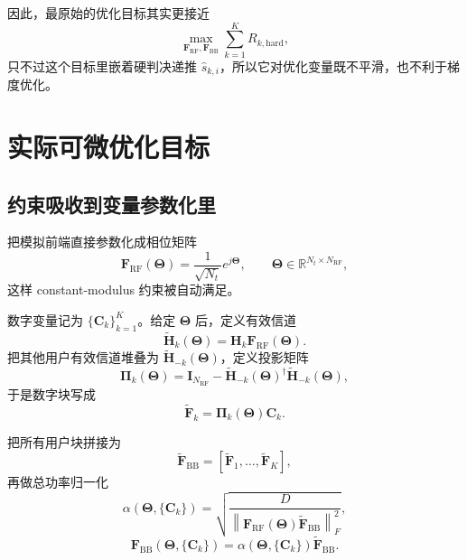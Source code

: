 \documentclass[11pt]{ctexart}
\newcommand{\Id}{\bm{I}}
\begin{document}
因此，最原始的优化目标其实更接近
\begin{equation}
    \max_{\bm F_{\mathrm{RF}},\bm F_{\mathrm{BB}}}
    \sum_{k=1}^{K} R_{k,\mathrm{hard}},
\end{equation}
只不过这个目标里嵌着硬判决递推 $\hat s_{k,i}$，所以它对优化变量既不平滑，也不利于梯度优化。

\section{实际可微优化目标}
\subsection{约束吸收到变量参数化里}
把模拟前端直接参数化成相位矩阵
\begin{equation}
    \bm{F}_{\mathrm{RF}}(\bm{\Theta})
    =
    \frac{1}{\sqrt{N_t}}e^{j\bm{\Theta}},
    \qquad
    \bm{\Theta}\in\mathbb{R}^{N_t\times N_{\mathrm{RF}}},
\end{equation}
这样 constant-modulus 约束被自动满足。

数字变量记为 $\{\bm{C}_k\}_{k=1}^K$。给定 $\bm{\Theta}$ 后，定义有效信道
\begin{equation}
    \widetilde{\bm{H}}_k(\bm{\Theta})
    =
    \bm{H}_k\bm{F}_{\mathrm{RF}}(\bm{\Theta}).
\end{equation}
把其他用户有效信道堆叠为 $\widetilde{\bm{H}}_{-k}(\bm{\Theta})$，定义投影矩阵
\begin{equation}
    \bm{\Pi}_k(\bm{\Theta})
    =
    \Id_{N_{\mathrm{RF}}}
    -
    \widetilde{\bm{H}}_{-k}(\bm{\Theta})^{\dagger}
    \widetilde{\bm{H}}_{-k}(\bm{\Theta}),
\end{equation}
于是数字块写成
\begin{equation}
    \widetilde{\bm{F}}_k
    =
    \bm{\Pi}_k(\bm{\Theta})\bm{C}_k.
\end{equation}

把所有用户块拼接为
\begin{equation}
    \widetilde{\bm{F}}_{\mathrm{BB}}
    =
    \left[
        \widetilde{\bm{F}}_1,\ldots,\widetilde{\bm{F}}_K
    \right],
\end{equation}
再做总功率归一化
\begin{equation}
    \alpha(\bm{\Theta},\{\bm{C}_k\})
    =
    \sqrt{
        \frac{D}{
            \left\|
                \bm{F}_{\mathrm{RF}}(\bm{\Theta})
                \widetilde{\bm{F}}_{\mathrm{BB}}
            \right\|_F^2
        }
    },
\end{equation}
\begin{equation}
    \bm{F}_{\mathrm{BB}}(\bm{\Theta},\{\bm{C}_k\})
    =
    \alpha(\bm{\Theta},\{\bm{C}_k\})\widetilde{\bm{F}}_{\mathrm{BB}}.
\end{equation}
\end{document}
